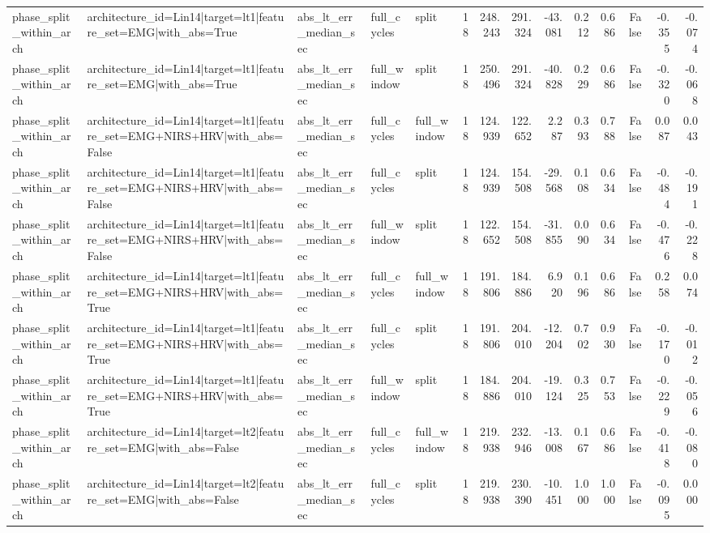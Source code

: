 \begin{table}
\begin{tabular}{lllllrrrrrrrrr}
phase_split_within_arch & architecture_id=Lin14|target=lt1|feature_set=EMG|with_abs=True & abs_lt_err_median_sec & full_cycles & split & 18 & 248.243 & 291.324 & -43.081 & 0.212 & 0.686 & False & -0.355 & -0.074 \\
phase_split_within_arch & architecture_id=Lin14|target=lt1|feature_set=EMG|with_abs=True & abs_lt_err_median_sec & full_window & split & 18 & 250.496 & 291.324 & -40.828 & 0.229 & 0.686 & False & -0.320 & -0.068 \\
phase_split_within_arch & architecture_id=Lin14|target=lt1|feature_set=EMG+NIRS+HRV|with_abs=False & abs_lt_err_median_sec & full_cycles & full_window & 18 & 124.939 & 122.652 & 2.287 & 0.393 & 0.788 & False & 0.087 & 0.043 \\
phase_split_within_arch & architecture_id=Lin14|target=lt1|feature_set=EMG+NIRS+HRV|with_abs=False & abs_lt_err_median_sec & full_cycles & split & 18 & 124.939 & 154.508 & -29.568 & 0.108 & 0.634 & False & -0.484 & -0.191 \\
phase_split_within_arch & architecture_id=Lin14|target=lt1|feature_set=EMG+NIRS+HRV|with_abs=False & abs_lt_err_median_sec & full_window & split & 18 & 122.652 & 154.508 & -31.855 & 0.090 & 0.634 & False & -0.476 & -0.228 \\
phase_split_within_arch & architecture_id=Lin14|target=lt1|feature_set=EMG+NIRS+HRV|with_abs=True & abs_lt_err_median_sec & full_cycles & full_window & 18 & 191.806 & 184.886 & 6.920 & 0.196 & 0.686 & False & 0.258 & 0.074 \\
phase_split_within_arch & architecture_id=Lin14|target=lt1|feature_set=EMG+NIRS+HRV|with_abs=True & abs_lt_err_median_sec & full_cycles & split & 18 & 191.806 & 204.010 & -12.204 & 0.702 & 0.930 & False & -0.170 & -0.012 \\
phase_split_within_arch & architecture_id=Lin14|target=lt1|feature_set=EMG+NIRS+HRV|with_abs=True & abs_lt_err_median_sec & full_window & split & 18 & 184.886 & 204.010 & -19.124 & 0.325 & 0.753 & False & -0.229 & -0.056 \\
phase_split_within_arch & architecture_id=Lin14|target=lt2|feature_set=EMG|with_abs=False & abs_lt_err_median_sec & full_cycles & full_window & 18 & 219.938 & 232.946 & -13.008 & 0.167 & 0.686 & False & -0.418 & -0.080 \\
phase_split_within_arch & architecture_id=Lin14|target=lt2|feature_set=EMG|with_abs=False & abs_lt_err_median_sec & full_cycles & split & 18 & 219.938 & 230.390 & -10.451 & 1.000 & 1.000 & False & -0.095 & 0.000 \\

\end{tabular}
\end{table}
